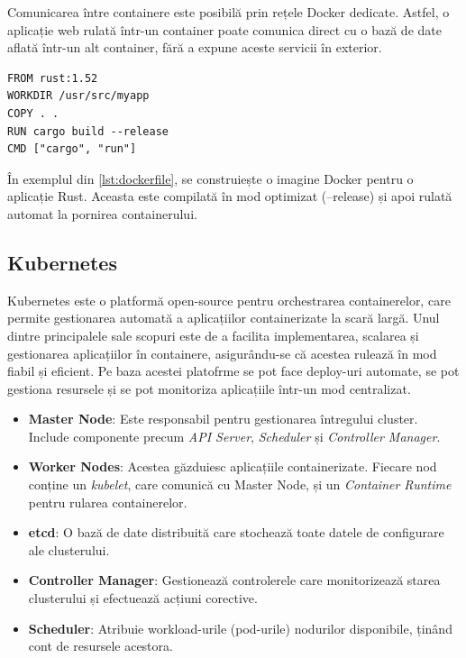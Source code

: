 \documentclass[titlepage,12pt]{article}
\DeclareRobustCommand{\code}[1]{{\ttfamily\small #1}}
\begin{document}
Comunicarea între containere este posibilă prin rețele Docker dedicate.
Astfel, o aplicație web rulată într-un container poate comunica direct cu o bază de date aflată într-un alt container, fără a expune aceste servicii în exterior.

\begin{lstlisting}[language=docker,caption={Exemplu Dockerfile},label={lst:dockerfile}]
FROM rust:1.52
WORKDIR /usr/src/myapp
COPY . .
RUN cargo build --release
CMD ["cargo", "run"]
\end{lstlisting}

În exemplul din \cref{lst:dockerfile}, se construiește o imagine Docker pentru o aplicație Rust.
Aceasta este compilată în mod optimizat (\code{--release}) și apoi rulată automat la pornirea containerului.

\subsection{Kubernetes}

Kubernetes este o platformă open-source pentru orchestrarea containerelor, care permite gestionarea automată a aplicațiilor containerizate la scară largă. Unul dintre principalele sale scopuri este de a facilita implementarea, scalarea și gestionarea aplicațiilor în containere, asigurându-se că acestea rulează în mod fiabil și eficient.
Pe baza acestei platofrme se pot face deploy-uri automate, se pot gestiona resursele și se pot monitoriza aplicațiile într-un mod centralizat.

\begin{itemize}
    \item \textbf{Master Node}: Este responsabil pentru gestionarea întregului cluster. Include componente precum \textit{API Server}, \textit{Scheduler} și \textit{Controller Manager}.
    \item \textbf{Worker Nodes}: Acestea găzduiesc aplicațiile containerizate. Fiecare nod conține un \textit{kubelet}, care comunică cu Master Node, și un \textit{Container Runtime} pentru rularea containerelor.
    \item \textbf{etcd}: O bază de date distribuită care stochează toate datele de configurare ale clusterului.
    \item \textbf{Controller Manager}: Gestionează controlerele care monitorizează starea clusterului și efectuează acțiuni corective.
    \item \textbf{Scheduler}: Atribuie workload-urile (pod-urile) nodurilor disponibile, ținând cont de resursele acestora.
\end{itemize}
\end{document}
